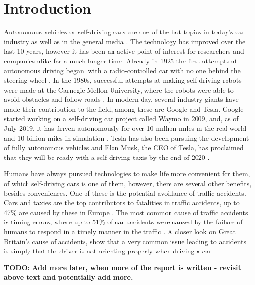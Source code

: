 \chapter{Introduction}\label{ch:introduction}
Autonomous vehicles or self-driving cars are one of the hot topics in today's car industry as well as in the general media \cite{self_autonomous_cars_finally_here, driverless_Cars_Are_Hot_topic, Autonomous_future_}.
The technology has improved over the last 10 years, however it has been an active point of interest for researchers and companies alike for a much longer time.
Already in 1925 the first attempts at autonomous driving began, with a radio-controlled car with no one behind the steering wheel \cite{digitalTrends_milestonesSelfdriving_2019}.
In the 1980s, successful attempts at making self-driving robots were made at the Carnegie-Mellon University, where the robots were able to avoid obstacles and follow roads \cite{wallace_roadFollowing_1986}.
In modern day, several industry giants have made their contribution to the field, among these are Google and Tesla.
Google started working on a self-driving car project called Waymo in 2009, and, as of July 2019, it has driven autonomously for over 10 million miles in the real world and 10 billion miles in simulation \cite{waymo_homepage, waymo_drivenTenBillionMiles}.
Tesla has also been pursuing the development of fully autonomous vehicles and Elon Musk, the CEO of Tesla, has proclaimed that they will be ready with a self-driving taxis by the end of 2020 \cite{boudette_elon_2019}.

Humans have always pursued technologies to make life more convenient for them, of which self-driving cars is one of them, however, there are several other benefits, besides conveniences.
One of these is the potential avoidance of traffic accidents.
Cars and taxies are the top contributors to fatalities in traffic accidents, up to 47\% are caused by these in Europe \cite{annual_accident_report_2018}.
The most common cause of traffic accidents is timing errors, where up to 51\% of car accidents were caused by the failure of humans to respond in a timely manner in the traffic \cite{thomas_identifying_2013}.
A closer look on Great Britain’s cause of accidents, show that a very common issue leading to accidents is simply that the driver is not orienting properly when driving a car \cite{statista_roadAccidents_2019}.

\textbf{TODO: Add more later, when more of the report is written - revisit above text and potentially add more.}
